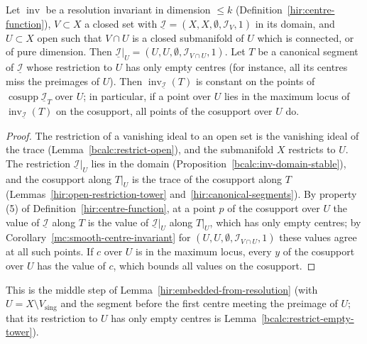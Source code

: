 \begin{lemma}
\label{mc:smooth-part-invariant}
\leanok
Let \(\operatorname{inv}\) be a resolution invariant in dimension \(\le k\) (Definition~\ref{hir:centre-function}), \(V\subset X\) a closed set with
\(\underline{\mathcal I}=(X,X,\emptyset,\mathcal I_V,1)\) in its domain, and \(U\subset X\) open such that \(V\cap U\) is a closed submanifold of \(U\) which is
connected, or of pure dimension. Then \(\underline{\mathcal I}|_U=(U,U,\emptyset,\mathcal I_{V\cap U},1)\). Let \(T\) be a canonical segment of \(\underline{\mathcal I}\)
whose restriction to \(U\) has only empty centres (for instance, all its centres miss the preimages of \(U\)). Then
\(\operatorname{inv}_{\underline{\mathcal I}}(T)\) is constant on the points of \(\operatorname{cosupp}\underline{\mathcal I}_T\) over \(U\); in particular, if a point over
\(U\) lies in the maximum locus of \(\operatorname{inv}_{\underline{\mathcal I}}(T)\) on the cosupport, all points of the cosupport over \(U\) do.
\end{lemma}
\begin{proof}
\leanok
The restriction of a vanishing ideal to an open set is the vanishing ideal of the trace (Lemma~\ref{bcalc:restrict-open}), and the submanifold \(X\) restricts to \(U\).
The restriction \(\underline{\mathcal I}|_U\) lies in the domain (Proposition~\ref{bcalc:inv-domain-stable}), and the cosupport along \(T|_U\) is the trace of the cosupport
along \(T\) (Lemmas~\ref{hir:open-restriction-tower} and~\ref{hir:canonical-segments}). By property (5) of Definition~\ref{hir:centre-function}, at a point \(p\) of the
cosupport over \(U\) the value of \(\underline{\mathcal I}\) along \(T\) is the value of \(\underline{\mathcal I}|_U\) along \(T|_U\), which has only empty centres; by
Corollary~\ref{mc:smooth-centre-invariant} for \((U,U,\emptyset,\mathcal I_{V\cap U},1)\) these values agree at all such points. If \(c\) over \(U\) is in the maximum
locus, every \(y\) of the cosupport over \(U\) has the value of \(c\), which bounds all values on the cosupport.
\end{proof}
This is the middle step of Lemma~\ref{hir:embedded-from-resolution} (with \(U=X\setminus V_{\mathrm{sing}}\) and the segment before the first centre meeting the preimage
of \(U\); that its restriction to \(U\) has only empty centres is Lemma~\ref{bcalc:restrict-empty-tower}).

